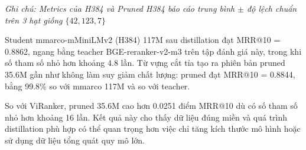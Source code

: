 \documentclass[../DoAn.tex]{subfiles}
\begin{document}
\begin{table}[H]
    \centering
    \caption{Kết quả reranker trên bộ 390 câu hỏi}
    \label{tab:reranker-main-results}
    {\small
    \setlength{\tabcolsep}{4pt}
    \renewcommand{\arraystretch}{1.15}
    }

    \vspace{2mm} {\footnotesize \textit{Ghi chú: Metrics của H384 và Pruned H384 báo cáo trung bình $\pm$ độ lệch chuẩn trên 3 hạt giống $\{42, 123, 7\}$}}
\end{table}

Student mmarco-\allowbreak mMiniLMv2 (H384) 117M sau distillation đạt MRR@10 = 0.8862, ngang bằng teacher BGE-\allowbreak reranker-\allowbreak v2-\allowbreak m3 trên tập đánh giá này, trong khi số tham số nhỏ hơn khoảng 4.8 lần. Từ vựng cắt tỉa tạo ra phiên bản pruned 35.6M gần như không làm suy giảm chất lượng: pruned đạt MRR@10 = 0.8844, bằng 99.8\% so với mmarco 117M và so với teacher.

So với ViRanker, pruned 35.6M cao hơn 0.0251 điểm MRR@10 dù có số tham số nhỏ hơn khoảng 16 lần. Kết quả này cho thấy dữ liệu đúng miền và quá trình distillation phù hợp có thể quan trọng hơn việc chỉ tăng kích thước mô hình hoặc sử dụng dữ liệu tổng quát quy mô lớn.
\end{document}
